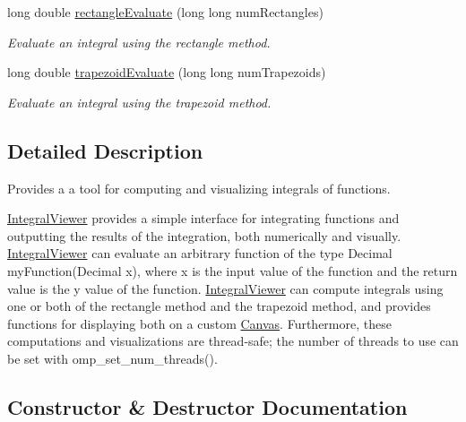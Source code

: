 \begin{DoxyCompactItemize}
long double \hyperlink{classtsgl_1_1_integral_viewer_a213d814ac293686ecd06c45344fa242f}{rectangle\+Evaluate} (long long num\+Rectangles)
\begin{DoxyCompactList}\small\item\em Evaluate an integral using the rectangle method. \end{DoxyCompactList}\item 
long double \hyperlink{classtsgl_1_1_integral_viewer_a485bd58c87267460baf013cdf786eae7}{trapezoid\+Evaluate} (long long num\+Trapezoids)
\begin{DoxyCompactList}\small\item\em Evaluate an integral using the trapezoid method. \end{DoxyCompactList}\end{DoxyCompactItemize}


\subsection{Detailed Description}
Provides a a tool for computing and visualizing integrals of functions. 

\hyperlink{classtsgl_1_1_integral_viewer}{Integral\+Viewer} provides a simple interface for integrating functions and outputting the results of the integration, both numerically and visually. \hyperlink{classtsgl_1_1_integral_viewer}{Integral\+Viewer} can evaluate an arbitrary function of the type {\ttfamily Decimal my\+Function(\+Decimal x)}, where x is the input value of the function and the return value is the y value of the function. \hyperlink{classtsgl_1_1_integral_viewer}{Integral\+Viewer} can compute integrals using one or both of the rectangle method and the trapezoid method, and provides functions for displaying both on a custom \hyperlink{classtsgl_1_1_canvas}{Canvas}. Furthermore, these computations and visualizations are thread-\/safe; the number of threads to use can be set with {\ttfamily omp\+\_\+set\+\_\+num\+\_\+threads()}. 

\subsection{Constructor \& Destructor Documentation}
\mbox{\label{classtsgl_1_1_integral_viewer_a1fe15a118865fcaf3067dc73cf3f912c}} 

